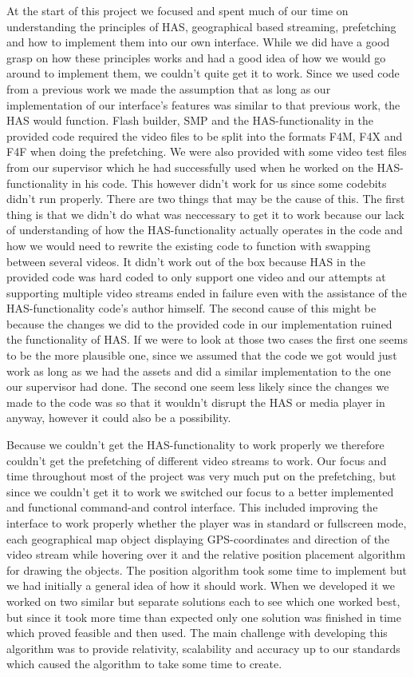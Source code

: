 At the start of this project we focused and spent much of our time on understanding the principles of HAS, geographical based streaming, prefetching and how to implement them into our own interface. While we did have a good grasp on how these principles works and had a good idea of how we would go around to implement them, we couldn’t quite get it to work. Since we used code from a previous work we made the assumption that as long as our implementation of our interface’s features was similar to that previous work, the HAS would function. Flash builder, SMP and the HAS-functionality in the provided code required the video files to be split into the formats F4M, F4X and F4F when doing the prefetching. We were also provided with some video test files from our supervisor which he had successfully used when he worked on the HAS-functionality in his code. This however didn’t work for us since some codebits didn’t run properly. There are two things that may be the cause of this. The first thing is that we didn’t do what was neccessary to get it to work because our lack of understanding of how the HAS-functionality actually operates in the code and how we would need to rewrite the existing code to function with swapping between several videos. It didn’t work out of the box because HAS in the provided code was hard coded to only support one video and our attempts at supporting multiple video streams ended in failure even with the assistance of the HAS-functionality code’s author himself. The second cause of this might be because the changes we did to the provided code in our implementation ruined the functionality of HAS. If we were to look at those two cases the first one seems to be the more plausible one, since we assumed that the code we got would just work as long as we had the assets and did a similar implementation to the one our supervisor had done. The second one seem less likely since the changes we made to the code was so that it wouldn’t disrupt the HAS or media player in anyway, however it could also be a possibility. 

Because we couldn’t get the HAS-functionality to work properly we therefore couldn’t get the prefetching of different video streams to work. Our focus and time throughout most of the project was very much put on the prefetching, but since we couldn’t get it to work we switched our focus to a better implemented and functional command-and control interface. This included improving the interface to work properly whether the player was in standard or fullscreen mode, each geographical map object displaying GPS-coordinates and direction of the video stream while hovering over it and the relative position placement algorithm for drawing the objects. The position algorithm took some time to implement but we had initially a general idea of how it should work. When we developed it we worked on two similar but separate solutions each to see which one worked best, but since it took more time than expected only one solution was finished in time which proved feasible and then used. The main challenge with developing this algorithm was to provide relativity, scalability and accuracy up to our standards which caused the algorithm to take some time to create.


